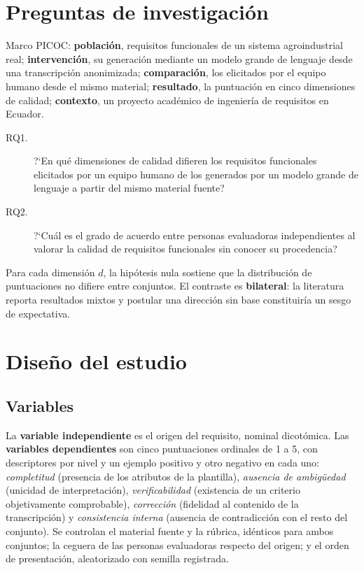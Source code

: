 \documentclass[runningheads]{llncs}
\begin{document}
\section{Preguntas de investigaci\'on}

Marco PICOC: \textbf{poblaci\'on}, requisitos funcionales de un sistema
agroindustrial real; \textbf{intervenci\'on}, su generaci\'on mediante un modelo
grande de lenguaje desde una transcripci\'on anonimizada; \textbf{comparaci\'on},
los elicitados por el equipo humano desde el mismo material; \textbf{resultado}, la
puntuaci\'on en cinco dimensiones de calidad; \textbf{contexto}, un proyecto
acad\'emico de ingenier\'ia de requisitos en Ecuador.

\begin{description}
\item[RQ1.] ?`En qu\'e dimensiones de calidad difieren los requisitos funcionales
elicitados por un equipo humano de los generados por un modelo grande de lenguaje
a partir del mismo material fuente?
\item[RQ2.] ?`Cu\'al es el grado de acuerdo entre personas evaluadoras
independientes al valorar la calidad de requisitos funcionales sin conocer su
procedencia?
\end{description}

Para cada dimensi\'on $d$, la hip\'otesis nula sostiene que la distribuci\'on de
puntuaciones no difiere entre conjuntos. El contraste es \textbf{bilateral}: la
literatura reporta resultados mixtos y postular una direcci\'on sin base
constituir\'ia un sesgo de expectativa.

\section{Dise\~no del estudio}
\label{sec:diseno}

\subsection{Variables}

La \textbf{variable independiente} es el origen del requisito, nominal
dicot\'omica. Las \textbf{variables dependientes} son cinco puntuaciones ordinales
de 1 a 5, con descriptores por nivel y un ejemplo positivo y otro negativo en cada
uno: \emph{completitud} (presencia de los atributos de la plantilla),
\emph{ausencia de ambig\"uedad} (unicidad de interpretaci\'on),
\emph{verificabilidad} (existencia de un criterio objetivamente comprobable),
\emph{correcci\'on} (fidelidad al contenido de la transcripci\'on) y
\emph{consistencia interna} (ausencia de contradicci\'on con el resto del
conjunto). Se controlan el material fuente y la r\'ubrica, id\'enticos para ambos
conjuntos; la ceguera de las personas evaluadoras respecto del origen; y el orden
de presentaci\'on, aleatorizado con semilla registrada.
\end{document}
